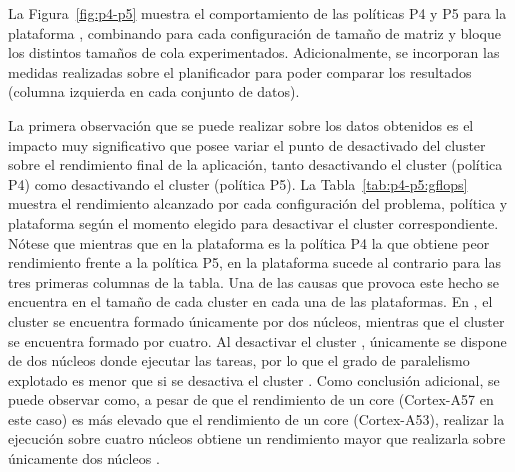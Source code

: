 \begin{table}

\end{table}


La Figura~\ref{fig:p4-p5} muestra el comportamiento de las políticas P4 y
P5 para la plataforma \juno, combinando para cada configuración de tamaño
de matriz y bloque los distintos tamaños de cola experimentados. 
Adicionalmente, se incorporan las medidas realizadas sobre el planificador
\botlev para poder comparar los resultados (columna izquierda en cada
conjunto de datos).

La primera observación que se puede realizar sobre los datos obtenidos es
el impacto muy significativo que posee variar el punto de desactivado del
cluster sobre el rendimiento final de la aplicación, tanto desactivando el
cluster \LITTLE (política P4) como desactivando el cluster \BIG (política
P5). La Tabla~\ref{tab:p4-p5:gflops} muestra el rendimiento alcanzado por
cada configuración del problema, política y plataforma según el momento
elegido para desactivar el cluster correspondiente. Nótese que mientras que
en la plataforma \juno es la política P4 la que obtiene peor rendimiento
frente a la política P5, en la plataforma \odroid sucede al contrario para
las tres primeras columnas de la tabla. Una de las causas que provoca este
hecho se encuentra en el tamaño de cada cluster en cada una de las
plataformas. En \juno, el cluster \BIG se encuentra formado únicamente por
dos núcleos, mientras que el cluster \LITTLE se encuentra formado por
cuatro. Al desactivar el cluster \LITTLE, únicamente se dispone de dos
núcleos donde ejecutar las tareas, por lo que el grado de paralelismo
explotado es menor que si se desactiva el cluster \BIG. Como conclusión
adicional, se puede observar como, a pesar de que el rendimiento de un core
\BIG (Cortex-A57 en este caso) es más elevado que el rendimiento de un core
\LITTLE (\mbox{Cortex-A53}), realizar la ejecución sobre cuatro núcleos
\LITTLE obtiene un rendimiento mayor que realizarla sobre únicamente dos
núcleos \BIG.


